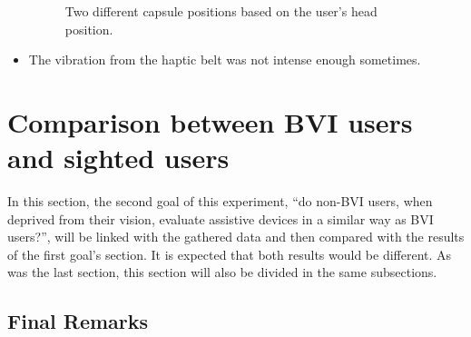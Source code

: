 \begin{itemize}
\begin{figure}[!htb]
\begin{minipage}{0.45\textwidth}
            \label{fig:user_looking_down}
        \end{minipage}
        \caption{Two different capsule positions based on the user's head position.}
        \label{fig:user_envelope}
    \end{figure}
    
    \item The vibration from the haptic belt was not intense enough sometimes.
\end{itemize}

\section{Comparison between BVI users and sighted users}

In this section, the second goal of this experiment, “do non-BVI users, when deprived from their vision, evaluate assistive devices in a similar way as BVI users?”, will be linked with the gathered data and then compared with the results of the first goal's section. It is expected that both results would be different. As was the last section, this section will also be divided in the same subsections.


 

\subsection{Final Remarks}


% 
%




